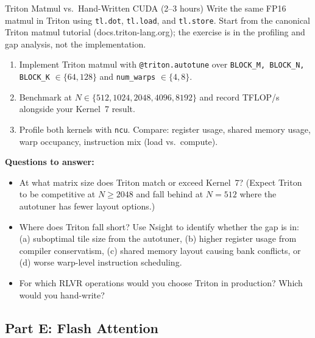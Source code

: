 \begin{exercise}{Triton Matmul vs.\ Hand-Written CUDA (2--3 hours)}
Write the same FP16 matmul in Triton using \texttt{tl.dot}, \texttt{tl.load}, and \texttt{tl.store}. Start from the canonical Triton matmul tutorial (docs.triton-lang.org); the exercise is in the profiling and gap analysis, not the implementation.

\begin{enumerate}
  \item Implement Triton matmul with \texttt{@triton.autotune} over \texttt{BLOCK\_M, BLOCK\_N, BLOCK\_K} $\in \{64, 128\}$ and \texttt{num\_warps} $\in \{4, 8\}$.
  \item Benchmark at $N \in \{512, 1024, 2048, 4096, 8192\}$ and record TFLOP/s alongside your Kernel~7 result.
  \item Profile both kernels with \texttt{ncu}. Compare: register usage, shared memory usage, warp occupancy, instruction mix (load vs.\ compute).
\end{enumerate}

\textbf{Questions to answer:}
\begin{itemize}
  \item At what matrix size does Triton match or exceed Kernel~7? (Expect Triton to be competitive at $N \geq 2048$ and fall behind at $N = 512$ where the autotuner has fewer layout options.)
  \item Where does Triton fall short? Use Nsight to identify whether the gap is in: (a) suboptimal tile size from the autotuner, (b) higher register usage from compiler conservatism, (c) shared memory layout causing bank conflicts, or (d) worse warp-level instruction scheduling.
  \item For which RLVR operations would you choose Triton in production? Which would you hand-write?
\end{itemize}
\end{exercise}

\subsection{Part E: Flash Attention}

